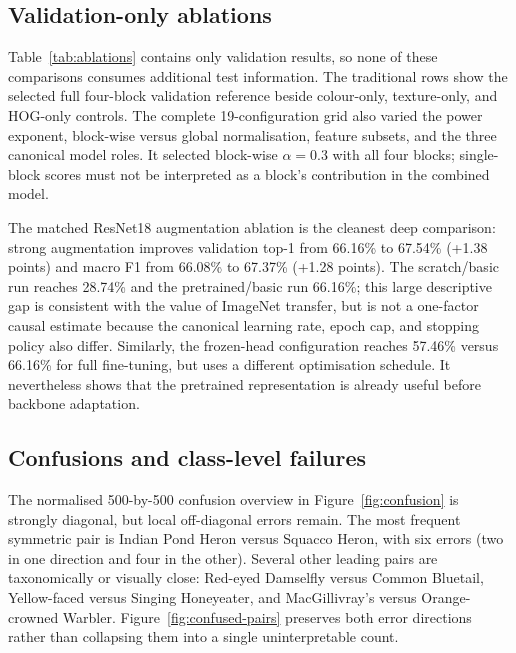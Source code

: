 \subsection{Validation-only ablations}

Table~\ref{tab:ablations} contains only validation results, so none of these
comparisons consumes additional test information.  The traditional rows show
the selected full four-block validation reference beside colour-only,
texture-only, and HOG-only controls.  The complete 19-configuration grid also
varied the power exponent, block-wise versus global normalisation, feature
subsets, and the three canonical model roles.  It selected block-wise
$\alpha{=}0.3$ with all four blocks; single-block scores must not be interpreted
as a block's contribution in the combined model.



The matched ResNet18 augmentation ablation is the cleanest deep comparison:
strong augmentation improves validation top-1 from 66.16\% to 67.54\%
(+1.38 points) and macro F1 from 66.08\% to 67.37\% (+1.28 points).  The
scratch/basic run reaches 28.74\% and the pretrained/basic run 66.16\%; this
large descriptive gap is consistent with the value of ImageNet transfer, but
is not a one-factor causal estimate because the canonical learning rate,
epoch cap, and stopping policy also differ.  Similarly, the frozen-head
configuration reaches 57.46\% versus 66.16\% for full fine-tuning, but uses a
different optimisation schedule.  It nevertheless shows that the pretrained
representation is already useful before backbone adaptation.

\subsection{Confusions and class-level failures}

The normalised 500-by-500 confusion overview in
Figure~\ref{fig:confusion} is strongly diagonal, but local off-diagonal errors
remain.  The most frequent symmetric pair is Indian Pond Heron versus Squacco
Heron, with six errors (two in one direction and four in the other).  Several
other leading pairs are taxonomically or visually close: Red-eyed Damselfly
versus Common Bluetail, Yellow-faced versus Singing Honeyeater, and
MacGillivray's versus Orange-crowned Warbler.  Figure~\ref{fig:confused-pairs}
preserves both error directions rather than collapsing them into a single
uninterpretable count.

